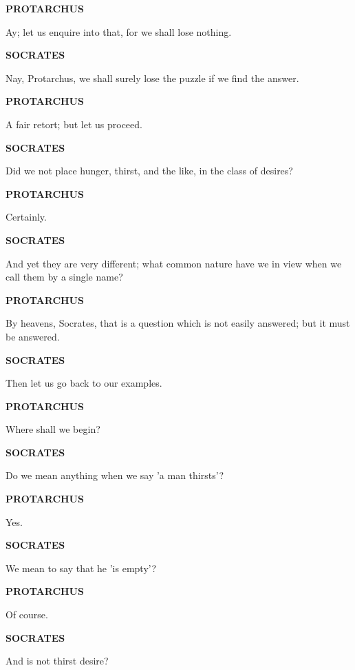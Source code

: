 \documentclass[11pt,letter]{article}
\begin{document}
\par \textbf{PROTARCHUS}
\par   Ay; let us enquire into that, for we shall lose nothing.

\par \textbf{SOCRATES}
\par   Nay, Protarchus, we shall surely lose the puzzle if we find the answer.

\par \textbf{PROTARCHUS}
\par   A fair retort; but let us proceed.

\par \textbf{SOCRATES}
\par   Did we not place hunger, thirst, and the like, in the class of desires?

\par \textbf{PROTARCHUS}
\par   Certainly.

\par \textbf{SOCRATES}
\par   And yet they are very different; what common nature have we in view when we call them by a single name?

\par \textbf{PROTARCHUS}
\par   By heavens, Socrates, that is a question which is not easily answered; but it must be answered.

\par \textbf{SOCRATES}
\par   Then let us go back to our examples.

\par \textbf{PROTARCHUS}
\par   Where shall we begin?

\par \textbf{SOCRATES}
\par   Do we mean anything when we say 'a man thirsts'?

\par \textbf{PROTARCHUS}
\par   Yes.

\par \textbf{SOCRATES}
\par   We mean to say that he 'is empty'?

\par \textbf{PROTARCHUS}
\par   Of course.

\par \textbf{SOCRATES}
\par   And is not thirst desire?
\end{document}
